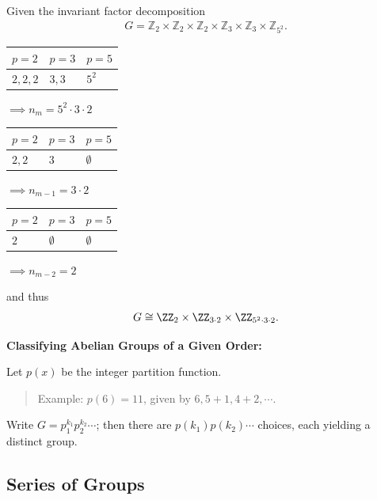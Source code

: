 \begin{example}

Given the invariant factor decomposition \begin{align*}
G = {\mathbb{Z}_{2}\times\mathbb{Z}_{2}\times\mathbb{Z}_{2}\times\mathbb{Z}_{3}\times\mathbb{Z}_{3}\times\mathbb{Z}_{5^2}}
.\end{align*}

\begin{longtable}[]{@{}lll@{}}
\toprule
\(p = 2\) & \(p= 3\) & \(p =5\)\tabularnewline
\midrule
\endhead
\(2,2,2\) & \(3,3\) & \(5^2\)\tabularnewline
\bottomrule
\end{longtable}

\(\implies n_m = 5^2 \cdot 3 \cdot 2\)

\begin{longtable}[]{@{}lll@{}}
\toprule
\(p = 2\) & \(p= 3\) & \(p =5\)\tabularnewline
\midrule
\endhead
\(2,2\) & \(3\) & \(\emptyset\)\tabularnewline
\bottomrule
\end{longtable}

\(\implies n_{m-1} = 3 \cdot 2\)

\begin{longtable}[]{@{}lll@{}}
\toprule
\(p = 2\) & \(p= 3\) & \(p =5\)\tabularnewline
\midrule
\endhead
\(2\) & \(\emptyset\) & \(\emptyset\)\tabularnewline
\bottomrule
\end{longtable}

\(\implies n_{m-2} = 2\)

and thus \begin{align*}
G\cong \ZZ_2 \times \ZZ_{3\cdot 2} \times \ZZ_{5^2 \cdot 3 \cdot 2}
.\end{align*}

\end{example}

\textbf{Classifying Abelian Groups of a Given Order:}

Let \(p(x)\) be the integer partition function.

\begin{quote}
Example: \(p(6) = 11\), given by \(6, 5+1, 4+2, \cdots\).
\end{quote}

Write \(G = p_1^{k_1} p_2^{k_2} \cdots\); then there are
\(p(k_1) p(k_2) \cdots\) choices, each yielding a distinct group.

\hypertarget{series-of-groups}{%
\subsection{Series of Groups}\label{series-of-groups}}

